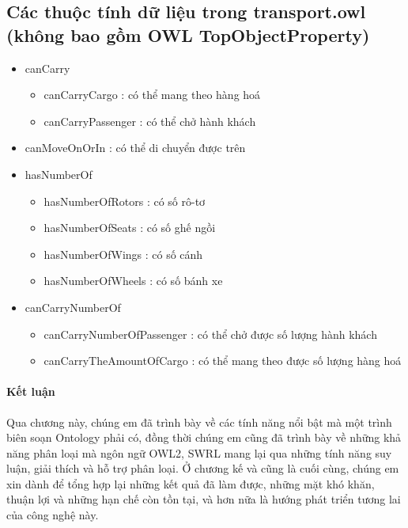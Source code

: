\subsection{Các thuộc tính dữ liệu trong transport.owl (không bao gồm OWL TopObjectProperty)}
\begin{itemize}
	\item canCarry
	\begin{itemize}
		\item canCarryCargo : có thể mang theo hàng hoá
		\item canCarryPassenger : có thể chở hành khách
	\end{itemize}
	\item canMoveOnOrIn : có thể di chuyển được trên
	\item hasNumberOf
	\begin{itemize}
		\item hasNumberOfRotors : có số rô-tơ
		\item hasNumberOfSeats : có số ghế ngồi
		\item hasNumberOfWings : có số cánh
		\item hasNumberOfWheels : có số bánh xe
	\end{itemize}
	\item canCarryNumberOf
	\begin{itemize}
	\item canCarryNumberOfPassenger : có thể chở được số lượng hành khách
	\item canCarryTheAmountOfCargo : có thể mang theo được số lượng hàng hoá
	\end{itemize}		
\end{itemize}

\paragraph{Kết luận} Qua chương này, chúng em đã trình bày về các tính năng nổi bật mà một trình biên soạn Ontology phải có, đồng thời chúng em cũng đã trình bày về những khả năng phân loại mà ngôn ngữ OWL2, SWRL mang lại qua những tính năng suy luận, giải thích và hỗ trợ phân loại. Ở chương kế và cũng là cuối cùng, chúng em xin dành để tổng hợp lại những kết quả đã làm được, những mặt khó khăn, thuận lợi và những hạn chế còn tồn tại, và hơn nữa là hướng phát triển tương lai của công nghệ này.





